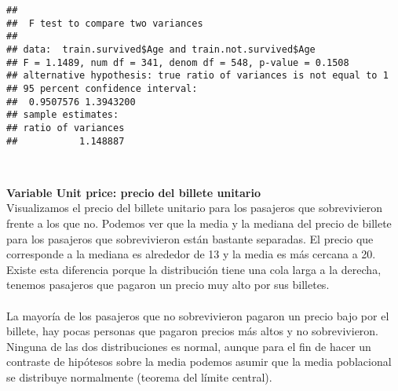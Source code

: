 \documentclass[
]{article}
\newenvironment{Shaded}{\begin{snugshade}}{\end{snugshade}}
\newcommand{\KeywordTok}[1]{\textcolor[rgb]{0.13,0.29,0.53}{\textbf{#1}}}
\newcommand{\NormalTok}[1]{#1}
\newcommand{\OperatorTok}[1]{\textcolor[rgb]{0.81,0.36,0.00}{\textbf{#1}}}
\newcommand{\StringTok}[1]{\textcolor[rgb]{0.31,0.60,0.02}{#1}}
\begin{document}
\begin{Shaded}
\end{Shaded}

\begin{verbatim}
## 
##  F test to compare two variances
## 
## data:  train.survived$Age and train.not.survived$Age
## F = 1.1489, num df = 341, denom df = 548, p-value = 0.1508
## alternative hypothesis: true ratio of variances is not equal to 1
## 95 percent confidence interval:
##  0.9507576 1.3943200
## sample estimates:
## ratio of variances 
##           1.148887
\end{verbatim}

\texttt{}~\\
\texttt{}

\textbf{Variable Unit price: precio del billete unitario} \texttt{}\\
Visualizamos el precio del billete unitario para los pasajeros que
sobrevivieron frente a los que no. Podemos ver que la media y la mediana
del precio de billete para los pasajeros que sobrevivieron están
bastante separadas. El precio que corresponde a la mediana es alrededor
de 13 y la media es más cercana a 20. Existe esta diferencia porque la
distribución tiene una cola larga a la derecha, tenemos pasajeros que
pagaron un precio muy alto por sus billetes.\\
\texttt{}~\\
La mayoría de los pasajeros que no sobrevivieron pagaron un precio bajo
por el billete, hay pocas personas que pagaron precios más altos y no
sobrevivieron. \texttt{}\\
Ninguna de las dos distribuciones es normal, aunque para el fin de hacer
un contraste de hipótesos sobre la media podemos asumir que la media
poblacional se distribuye normalmente (teorema del límite central).\\
\texttt{}

\begin{Shaded}
\end{Shaded}
\end{document}
